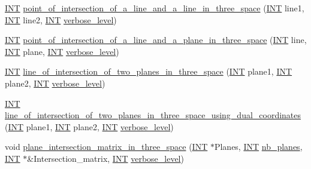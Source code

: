 \begin{DoxyCompactItemize}
\item 
\mbox{\hyperlink{galois_8h_a09fddde158a3a20bd2dcadb609de11dc}{I\+NT}} \mbox{\hyperlink{classprojective__space_a305ed998300ced29ba09ca5071160a99}{point\+\_\+of\+\_\+intersection\+\_\+of\+\_\+a\+\_\+line\+\_\+and\+\_\+a\+\_\+line\+\_\+in\+\_\+three\+\_\+space}} (\mbox{\hyperlink{galois_8h_a09fddde158a3a20bd2dcadb609de11dc}{I\+NT}} line1, \mbox{\hyperlink{galois_8h_a09fddde158a3a20bd2dcadb609de11dc}{I\+NT}} line2, \mbox{\hyperlink{galois_8h_a09fddde158a3a20bd2dcadb609de11dc}{I\+NT}} \mbox{\hyperlink{simeon_8_c_a818073fbcc2f439e7c56952f67386122}{verbose\+\_\+level}})
\item 
\mbox{\hyperlink{galois_8h_a09fddde158a3a20bd2dcadb609de11dc}{I\+NT}} \mbox{\hyperlink{classprojective__space_ac43301e2e6d9e5d77c2730271b11cb66}{point\+\_\+of\+\_\+intersection\+\_\+of\+\_\+a\+\_\+line\+\_\+and\+\_\+a\+\_\+plane\+\_\+in\+\_\+three\+\_\+space}} (\mbox{\hyperlink{galois_8h_a09fddde158a3a20bd2dcadb609de11dc}{I\+NT}} line, \mbox{\hyperlink{galois_8h_a09fddde158a3a20bd2dcadb609de11dc}{I\+NT}} plane, \mbox{\hyperlink{galois_8h_a09fddde158a3a20bd2dcadb609de11dc}{I\+NT}} \mbox{\hyperlink{simeon_8_c_a818073fbcc2f439e7c56952f67386122}{verbose\+\_\+level}})
\item 
\mbox{\hyperlink{galois_8h_a09fddde158a3a20bd2dcadb609de11dc}{I\+NT}} \mbox{\hyperlink{classprojective__space_a3880f6e83ae3714be79786a3a4cb881e}{line\+\_\+of\+\_\+intersection\+\_\+of\+\_\+two\+\_\+planes\+\_\+in\+\_\+three\+\_\+space}} (\mbox{\hyperlink{galois_8h_a09fddde158a3a20bd2dcadb609de11dc}{I\+NT}} plane1, \mbox{\hyperlink{galois_8h_a09fddde158a3a20bd2dcadb609de11dc}{I\+NT}} plane2, \mbox{\hyperlink{galois_8h_a09fddde158a3a20bd2dcadb609de11dc}{I\+NT}} \mbox{\hyperlink{simeon_8_c_a818073fbcc2f439e7c56952f67386122}{verbose\+\_\+level}})
\item 
\mbox{\hyperlink{galois_8h_a09fddde158a3a20bd2dcadb609de11dc}{I\+NT}} \mbox{\hyperlink{classprojective__space_a78bdbe289a9f502cb69b6fdaac6df61a}{line\+\_\+of\+\_\+intersection\+\_\+of\+\_\+two\+\_\+planes\+\_\+in\+\_\+three\+\_\+space\+\_\+using\+\_\+dual\+\_\+coordinates}} (\mbox{\hyperlink{galois_8h_a09fddde158a3a20bd2dcadb609de11dc}{I\+NT}} plane1, \mbox{\hyperlink{galois_8h_a09fddde158a3a20bd2dcadb609de11dc}{I\+NT}} plane2, \mbox{\hyperlink{galois_8h_a09fddde158a3a20bd2dcadb609de11dc}{I\+NT}} \mbox{\hyperlink{simeon_8_c_a818073fbcc2f439e7c56952f67386122}{verbose\+\_\+level}})
\item 
void \mbox{\hyperlink{classprojective__space_aa4e6a1f8f4297e5b3098e548fd7e2696}{plane\+\_\+intersection\+\_\+matrix\+\_\+in\+\_\+three\+\_\+space}} (\mbox{\hyperlink{galois_8h_a09fddde158a3a20bd2dcadb609de11dc}{I\+NT}} $\ast$Planes, \mbox{\hyperlink{galois_8h_a09fddde158a3a20bd2dcadb609de11dc}{I\+NT}} \mbox{\hyperlink{hamming_8_c_a91ce15bbcb035246151f54bb92118e70}{nb\+\_\+planes}}, \mbox{\hyperlink{galois_8h_a09fddde158a3a20bd2dcadb609de11dc}{I\+NT}} $\ast$\&Intersection\+\_\+matrix, \mbox{\hyperlink{galois_8h_a09fddde158a3a20bd2dcadb609de11dc}{I\+NT}} \mbox{\hyperlink{simeon_8_c_a818073fbcc2f439e7c56952f67386122}{verbose\+\_\+level}})

\end{DoxyCompactItemize}
